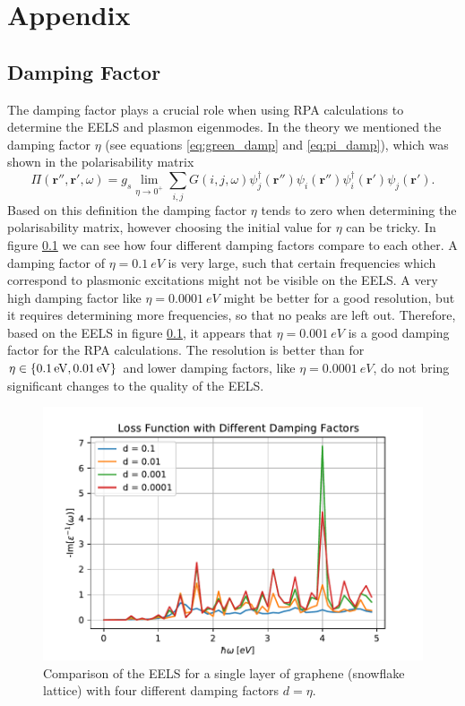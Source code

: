 \appendix
\renewcommand\thefigure{\thesection.\arabic{figure}}
\chapter*{Appendix}
\setcounter{section}{0}
\renewcommand{\thesection}{\Alph{section}}


\section{Damping Factor}\label{damping}

The damping factor plays a crucial role when using RPA calculations to determine the EELS and plasmon eigenmodes. In the theory we mentioned the damping factor $\eta$ (see equations \ref{eq:green_damp} and \ref{eq:pi_damp}), which was shown in the polarisability matrix
\begin{equation}
    \Pi(\mathbf{r}'',\mathbf{r}',\omega) = g_s \lim_{\eta\to 0^+}\sum_{i,j} G(i,j,\omega)\psi_j^\dagger (\mathbf{r}'')\psi_i (\mathbf{r}'')\psi_i^\dagger (\mathbf{r}')\psi_j (\mathbf{r}').
\end{equation}
Based on this definition the damping factor $\eta$ tends to zero when determining the polarisability matrix, however choosing the initial value for $\eta$ can be tricky. In figure \ref{fig:damp_comp} we can see how four different damping factors compare to each other. A damping factor of $\eta=\SI{0.1}{eV}$ is very large, such that certain frequencies which correspond to plasmonic excitations might not be visible on the EELS. A very high damping factor like $\eta=\SI{0.0001}{eV}$ might be better for a good resolution, but it requires determining more frequencies, so that no peaks are left out. Therefore, based on the EELS in figure \ref{fig:damp_comp}, it appears that $\eta=\SI{0.001}{eV}$ is a good damping factor for the RPA calculations. The resolution is better than for $\eta\in\left\{\SI{0.1}{eV},\SI{0.01}{eV}\right\}$ and lower damping factors, like $\eta=\SI{0.0001}{eV}$, do not bring significant changes to the quality of the EELS.

\begin{figure}[H]
    \centering
    \includegraphics[width=.7\textwidth]{img/eels_damp_comparison.pdf}
    \caption{Comparison of the EELS for a single layer of graphene (snowflake lattice) with four different damping factors $d = \eta$.}
    \label{fig:damp_comp}
\end{figure}



